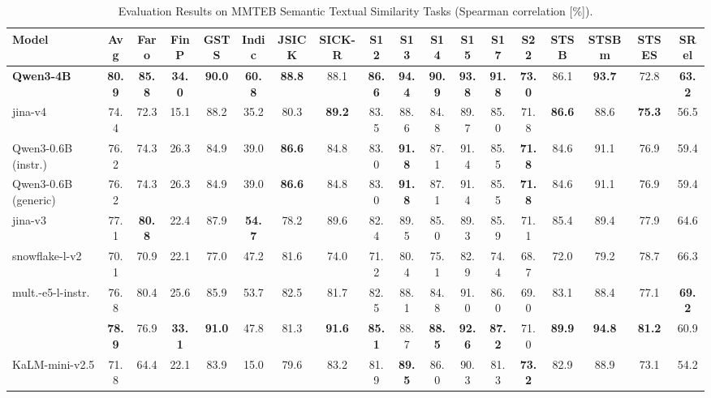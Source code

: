 \documentclass[11pt]{article}
\begin{document}
\begin{table}[H]
\caption{Evaluation Results on MMTEB Semantic Textual Similarity Tasks (Spearman correlation [\%]).}
\label{tab:mmteb_sts}
\setlength{\tabcolsep}{2pt}
\centering
\small
\begin{tabular}{@{}lccccccccccccccccc@{}}
\toprule
\textbf{Model} & \textbf{Avg} & \textbf{Faro} & \textbf{FinP} & \textbf{GSTS} & \textbf{Indic} & \textbf{JSICK} & \textbf{SICK-R} & \textbf{S12} & \textbf{S13} & \textbf{S14} & \textbf{S15} & \textbf{S17} & \textbf{S22} & \textbf{STSB} & \textbf{STSBm} & \textbf{STSES} & \textbf{SRel} \\
\midrule
\textbf{Qwen3-4B} & \textbf{80.9} & \textbf{85.8} & \textbf{34.0} & \textbf{90.0} & \textbf{60.8} & \textbf{88.8} & 88.1 & \textbf{86.6} & \textbf{94.4} & \textbf{90.9} & \textbf{93.8} & \textbf{91.8} & \textbf{73.0} & 86.1 & \textbf{93.7} & 72.8 & \textbf{63.2} \\
jina-v4 & 74.4 & 72.3 & 15.1 & 88.2 & 35.2 & 80.3 & \textbf{89.2} & 83.5 & 88.6 & 84.8 & 89.7 & 85.0 & 71.8 & \textbf{86.6} & 88.6 & \textbf{75.3} & 56.5 \\
\midrule
Qwen3-0.6B (instr.) & 76.2 & 74.3 & 26.3 & 84.9 & 39.0 & \textbf{86.6} & 84.8 & 83.0 & \textbf{91.8} & 87.1 & 91.4 & 85.5 & \textbf{71.8} & 84.6 & 91.1 & 76.9 & 59.4 \\
Qwen3-0.6B (generic) & 76.2 & 74.3 & 26.3 & 84.9 & 39.0 & \textbf{86.6} & 84.8 & 83.0 & \textbf{91.8} & 87.1 & 91.4 & 85.5 & \textbf{71.8} & 84.6 & 91.1 & 76.9 & 59.4 \\
jina-v3 & 77.1 & \textbf{80.8} & 22.4 & 87.9 & \textbf{54.7} & 78.2 & 89.6 & 82.4 & 89.5 & 85.0 & 89.3 & 85.9 & 71.1 & 85.4 & 89.4 & 77.9 & 64.6 \\
snowflake-l-v2 & 70.1 & 70.9 & 22.1 & 77.0 & 47.2 & 81.6 & 74.0 & 71.2 & 80.4 & 75.1 & 82.9 & 74.4 & 68.7 & 72.0 & 79.2 & 78.7 & 66.3 \\
mult.-e5-l-instr. & 76.8 & 80.4 & 25.6 & 85.9 & 53.7 & 82.5 & 81.7 & 82.5 & 88.1 & 84.8 & 91.0 & 86.0 & 69.0 & 83.1 & 88.4 & 77.1 & \textbf{69.2} \\
\textbf{\JEmbeddingVFiveTextSmallShort{}} & \textbf{78.9} & 76.9 & \textbf{33.1} & \textbf{91.0} & 47.8 & 81.3 & \textbf{91.6} & \textbf{85.1} & 88.7 & \textbf{88.5} & \textbf{92.6} & \textbf{87.2} & 71.0 & \textbf{89.9} & \textbf{94.8} & \textbf{81.2} & 60.9 \\
\midrule
KaLM-mini-v2.5 & 71.8 & 64.4 & 22.1 & 83.9 & 15.0 & 79.6 & 83.2 & 81.9 & \textbf{89.5} & 86.0 & 90.3 & 81.3 & \textbf{73.2} & 82.9 & 88.9 & 73.1 & 54.2 \\

\end{tabular}
\end{table}
\end{document}
